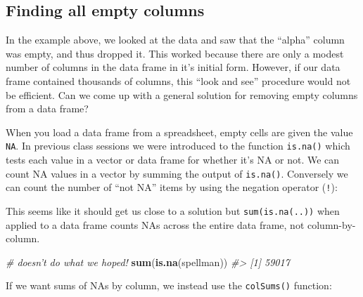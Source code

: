 \documentclass[]{book}
\newenvironment{Shaded}{\begin{snugshade}}{\end{snugshade}}
\newcommand{\CommentTok}[1]{\textcolor[rgb]{0.56,0.35,0.01}{\textit{#1}}}
\newcommand{\KeywordTok}[1]{\textcolor[rgb]{0.13,0.29,0.53}{\textbf{#1}}}
\newcommand{\NormalTok}[1]{#1}
\newcommand{\OperatorTok}[1]{\textcolor[rgb]{0.81,0.36,0.00}{\textbf{#1}}}
\theoremstyle{definition}
\theoremstyle{definition}
\theoremstyle{definition}
\theoremstyle{remark}
\begin{document}
\hypertarget{finding-all-empty-columns}{%
\subsection{Finding all empty columns}\label{finding-all-empty-columns}}

In the example above, we looked at the data and saw that the ``alpha''
column was empty, and thus dropped it. This worked because there are
only a modest number of columns in the data frame in it's initial form.
However, if our data frame contained thousands of columns, this ``look
and see'' procedure would not be efficient. Can we come up with a
general solution for removing empty columns from a data frame?

When you load a data frame from a spreadsheet, empty cells are given the
value \texttt{NA}. In previous class sessions we were introduced to the
function \texttt{is.na()} which tests each value in a vector or data
frame for whether it's NA or not. We can count NA values in a vector by
summing the output of \texttt{is.na()}. Conversely we can count the
number of ``not NA'' items by using the negation operator (\texttt{!}):

\begin{Shaded}
\end{Shaded}

This seems like it should get us close to a solution but
\texttt{sum(is.na(..))} when applied to a data frame counts NAs across
the entire data frame, not column-by-column.

\begin{Shaded}
\begin{Highlighting}[]
\CommentTok{# doesn't do what we hoped!}
\KeywordTok{sum}\NormalTok{(}\KeywordTok{is.na}\NormalTok{(spellman))}
\CommentTok{#> [1] 59017}
\end{Highlighting}
\end{Shaded}

If we want sums of NAs by column, we instead use the \texttt{colSums()}
function:
\end{document}
